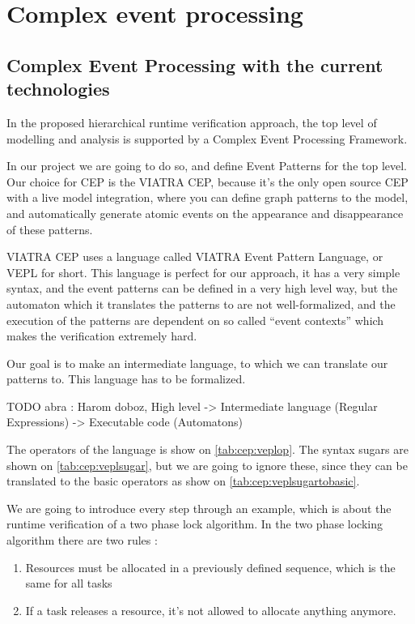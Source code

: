 \chapter{Complex event processing}
	\label{chap:cep}
	\section{Complex Event Processing with the current technologies}
		In the proposed hierarchical runtime verification approach, the top level of modelling and analysis is supported by a Complex Event Processing Framework.
		
		In our project we are going to do so, and define Event Patterns for the top level.
		Our choice for CEP is the VIATRA CEP, because it's the only open source CEP with 
		a live model integration, where you can define graph patterns to the model, and automatically generate atomic events
		on the appearance and disappearance of these patterns.
		
		VIATRA CEP uses a language called VIATRA Event Pattern Language, or VEPL for short.
		This language is perfect for our approach, it has a very simple syntax, and the event patterns can be defined in
		a very high level way, but the automaton which it translates the patterns to are not well-formalized, and the
		execution of the patterns are dependent on so called ``event contexts'' which makes the verification extremely hard.
		
		Our goal is to make an intermediate language, to which we can translate our patterns to. This language has to be 
		formalized.
		
		TODO abra : Harom doboz, High level -> Intermediate language (Regular Expressions) -> Executable code (Automatons)

		The operators of the language is show on \cref{tab:cep:veplop}. 
		The syntax sugars are shown on \cref{tab:cep:veplsugar},
		but we are going to ignore these, since they can be translated to the basic operators as show on \cref{tab:cep:veplsugartobasic}.
		
		We are going to introduce every step through an example, which is about the runtime verification of a two phase lock algorithm. %
		In the two phase locking algorithm there are two rules :
		\begin{enumerate}
			\item Resources must be allocated in a previously defined sequence, which is the same for all tasks
			\item If a task releases a resource, it's not allowed to allocate anything anymore.
		\end{enumerate}
		

